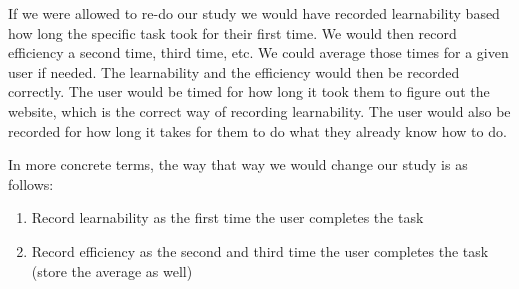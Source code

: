 \documentclass[11pt, oneside]{article}
\begin{document}
If we were allowed to re-do our study we would have recorded learnability based how long the specific task took for their first time. We would then record efficiency a second time, third time, etc. We could average those times for a given user if needed. The learnability and the efficiency would then be recorded correctly. The user would be timed for how long it took them to figure out the website, which is the correct way of recording learnability. The user would also be recorded for how long it takes for them to do what they already know how to do.

In more concrete terms, the way that way we would change our study is as follows:

\begin{enumerate}
\item Record learnability as the first time the user completes the task
\item Record efficiency as the second and third time the user completes the task (store the average as well)
\end{enumerate} 
\end{document}
